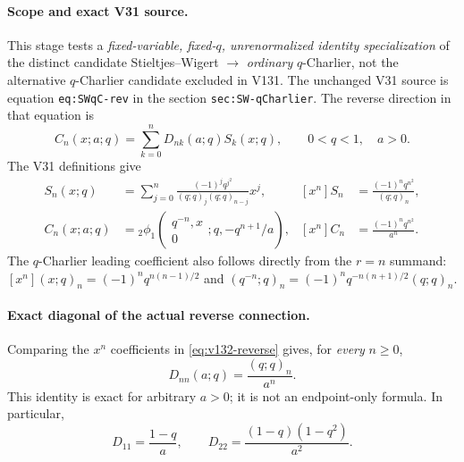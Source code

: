 \documentclass[11pt]{article}
\begin{document}
\paragraph{Scope and exact V31 source.}
This stage tests a \emph{fixed-variable, fixed-$q$, unrenormalized identity specialization} of the distinct candidate Stieltjes--Wigert $\to$ \emph{ordinary} $q$-Charlier, not the alternative $q$-Charlier candidate excluded in V131.  The unchanged V31 source is equation \texttt{eq:SWqC-rev} in the section \texttt{sec:SW-qCharlier}.  The reverse direction in that equation is
\begin{equation}\label{eq:v132-reverse}
 C_n(x;a;q)=\sum_{k=0}^n D_{nk}(a;q)S_k(x;q),\qquad 0<q<1,\quad a>0.
\end{equation}
The V31 definitions give
\begin{align}
 S_n(x;q)&=\sum_{j=0}^n\frac{(-1)^j q^{j^2}}{(q;q)_j(q;q)_{n-j}}x^j,
 & [x^n]S_n&=\frac{(-1)^nq^{n^2}}{(q;q)_n},\\
 C_n(x;a;q)&={}_2\phi_1\!\left(\begin{matrix}q^{-n},x\\0\end{matrix};q,-q^{n+1}/a\right),
 & [x^n]C_n&=\frac{(-1)^nq^{n^2}}{a^n}.
\end{align}
The $q$-Charlier leading coefficient also follows directly from the $r=n$ summand: $[x^n](x;q)_n=(-1)^nq^{n(n-1)/2}$ and $(q^{-n};q)_n=(-1)^nq^{-n(n+1)/2}(q;q)_n$.

\paragraph{Exact diagonal of the actual reverse connection.}
Comparing the $x^n$ coefficients in \eqref{eq:v132-reverse} gives, for \emph{every} $n\ge0$,
\begin{equation}\label{eq:v132-diagonal}
 \boxed{D_{nn}(a;q)=\frac{(q;q)_n}{a^n}.}
\end{equation}
This identity is exact for arbitrary $a>0$; it is not an endpoint-only formula.  In particular,
\begin{equation}\label{eq:v132-first-two}
 D_{11}=\frac{1-q}{a},\qquad
 D_{22}=\frac{(1-q)(1-q^2)}{a^2}.
\end{equation}
\end{document}
